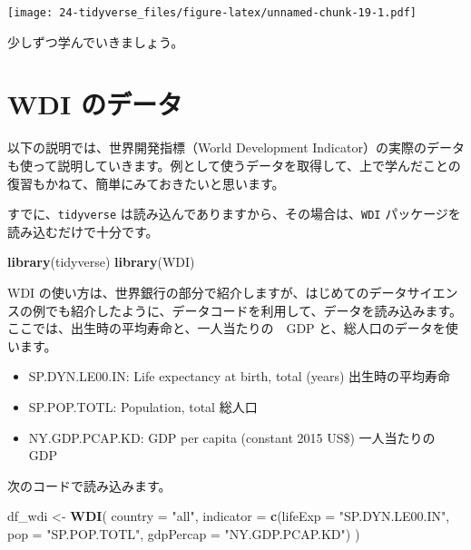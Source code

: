 \documentclass[
  xelatex, ja=standard]{bxjsbook}
\newenvironment{Shaded}{\begin{snugshade}}{\end{snugshade}}
\newcommand{\AttributeTok}[1]{\textcolor[rgb]{0.13,0.29,0.53}{#1}}
\newcommand{\FunctionTok}[1]{\textcolor[rgb]{0.13,0.29,0.53}{\textbf{#1}}}
\newcommand{\NormalTok}[1]{#1}
\newcommand{\OtherTok}[1]{\textcolor[rgb]{0.56,0.35,0.01}{#1}}
\newcommand{\StringTok}[1]{\textcolor[rgb]{0.31,0.60,0.02}{#1}}
\providecommand{\tightlist}{%
  \setlength{\itemsep}{0pt}\setlength{\parskip}{0pt}}
\theoremstyle{definition}
\theoremstyle{definition}
\theoremstyle{definition}
\theoremstyle{definition}
\theoremstyle{remark}
\begin{document}
\texttt{[image: 24-tidyverse\_files/figure-latex/unnamed-chunk-19-1.pdf]}

少しずつ学んでいきましょう。

\hypertarget{wdi-ux306eux30c7ux30fcux30bf}{%
\section{WDI のデータ}\label{wdi-ux306eux30c7ux30fcux30bf}}

以下の説明では、世界開発指標（World Development Indicator）の実際のデータも使って説明していきます。例として使うデータを取得して、上で学んだことの復習もかねて、簡単にみておきたいと思います。

すでに、\texttt{tidyverse} は読み込んでありますから、その場合は、\texttt{WDI} パッケージを読み込むだけで十分です。

\begin{Shaded}
\begin{Highlighting}[]
\FunctionTok{library}\NormalTok{(tidyverse)}
\FunctionTok{library}\NormalTok{(WDI)}
\end{Highlighting}
\end{Shaded}

WDI の使い方は、世界銀行の部分で紹介しますが、はじめてのデータサイエンスの例でも紹介したように、データコードを利用して、データを読み込みます。ここでは、出生時の平均寿命と、一人当たりの　GDP と、総人口のデータを使います。

\begin{itemize}
\tightlist
\item
  SP.DYN.LE00.IN: Life expectancy at birth, total (years) 出生時の平均寿命
\item
  SP.POP.TOTL: Population, total 総人口
\item
  NY.GDP.PCAP.KD: GDP per capita (constant 2015 US\$) 一人当たりの　GDP
\end{itemize}

次のコードで読み込みます。

\begin{Shaded}
\begin{Highlighting}[]
\NormalTok{df\_wdi }\OtherTok{\textless{}{-}} \FunctionTok{WDI}\NormalTok{(}
  \AttributeTok{country =} \StringTok{"all"}\NormalTok{, }
  \AttributeTok{indicator =} \FunctionTok{c}\NormalTok{(}\AttributeTok{lifeExp =} \StringTok{"SP.DYN.LE00.IN"}\NormalTok{, }\AttributeTok{pop =} \StringTok{"SP.POP.TOTL"}\NormalTok{, }\AttributeTok{gdpPercap =} \StringTok{"NY.GDP.PCAP.KD"}\NormalTok{)}
\NormalTok{)}
\end{Highlighting}
\end{Shaded}
\end{document}
